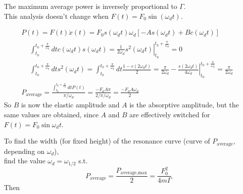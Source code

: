 \documentclass[10pt]{amsart}
\begin{document}
\begin{multicols*}{2}
The maximum average power is inversely proportional to $\Gamma$. \\

This analysis doesn't change when $F(t) = F_0 \sin{(\omega_d t)}$.

\[
\begin{gathered}
P(t) = F(t) \dot{x}(t) = F_0 s(\omega_d t) \omega_d [ -A s(\omega_d t) + Bc(\omega_d t) ] \\
\begin{aligned}
& \int_{t_0}^{t_0 + \frac{\pi}{\omega_d} } dt c(\omega_dt) s(\omega_d t) = \left. \frac{1}{2 \omega_d} s^2(\omega_d t) \right|_{t_0}^{t_0 + \frac{\pi}{\omega_d} } = 0 \\
& \int_{t_0}^{t_0 + \frac{\pi}{\omega_d} } dt s^2(\omega_dt) = \int_{t_0}^{t_0 + \frac{\pi}{\omega_d} } dt \frac{1 - c(2\omega_dt)}{2} = \frac{\pi}{2 \omega_d} - \left. \frac{s(2\omega_dt)}{ 4\omega_d} \right|_{t_0}^{t_0 + \frac{\pi}{\omega_d} } = \frac{\pi}{2\omega_d}
\end{aligned} \\
P_{\text{average}} = \frac{ \int_{t_0}^{t_0 + \frac{\pi}{\omega_d} } dt P(t) }{ \pi /\omega_d} = \frac{-F_0 A \pi}{2 / \pi/\omega_d} = \frac{-F_0 A \omega_d}{2}
\end{gathered}
\]
So $B$ is now the elastic amplitude and $A$ is the absorptive amplitude, but the same values are obtained, since $A$ and $B$ are effectively switched for $F(t) = F_0 \sin{\omega_d t}$.


To find the width (for fixed height) of the resonance curve (curve of $P_{\text{average}}$, depending on $\omega_d$), \\
find the value $\omega_d = \omega_{1/2}$ s.t. 
\[
P_{\text{average}} = \frac{P_{\text{average,max}}}{2} = \frac{F_0^2}{4m \Gamma}
\]
Then


\end{multicols*}
\end{document}
